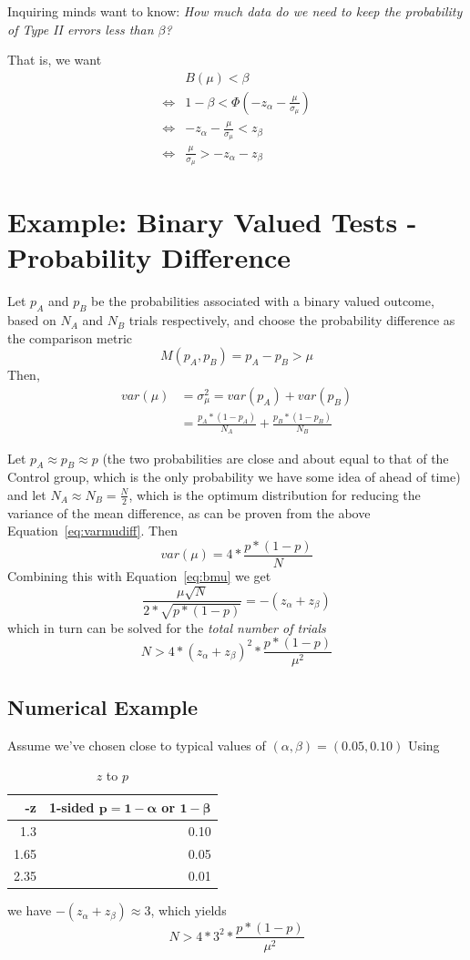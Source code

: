 \documentclass[letterpaper,12pt]{article}
\newcommand{\beq}{\begin{equation}} %
\newcommand{\eeq}{\end{equation}} %
\newcommand{\bb}[1]{\mathbf{#1}}
\begin{document}
Inquiring minds want to know: {\em How much data do we need to keep the probability of Type II errors less than \(\beta\)?}

That is, we want
\beq\label{eq:bmu}
\begin{split}
 & B(\mu)<\beta \\
  \iff& 1-\beta < \Phi(-z_\alpha -\frac{\mu}{\sigma_\mu})\\
  \iff& -z_\alpha -\frac{\mu}{\sigma_\mu} < z_\beta\\
  \iff& \frac{\mu}{\sigma_\mu} > -z_\alpha -z_\beta
\end{split}
\eeq

\section{Example: Binary Valued Tests - Probability Difference}
Let \(p_A\) and \(p_B\) be the probabilities associated with a binary valued outcome, based on \(N_A\) and \(N_B\) trials respectively, and choose the probability difference as the comparison metric
\beq
M(p_A, p_B) = p_A-p_B >\mu
\eeq
Then,
\beq\label{eq:varmudiff}
\begin{split}
  var(\mu)&=\sigma^2_\mu = var(p_A) + var(p_B)\\
  &=\frac{p_A*(1-p_A)}{N_A} + \frac{p_B*(1-p_B)}{N_B}
  \end{split}
\eeq

Let \(p_A\approx p_B\approx p\) (the two probabilities are close and about equal to that of the Control group, which is the only probability we have some idea of ahead of time) and let \(N_A\approx N_B = \frac{N}{2}\), which is the optimum distribution for reducing the variance of the mean difference, as can be proven from the above Equation~\ref{eq:varmudiff}. Then
\beq
var(\mu) = 4*\frac{p*(1-p)}{N}
\eeq
Combining this with Equation~\ref{eq:bmu} we get
\beq
\frac{\mu\sqrt{N}}{2*\sqrt{p*(1-p)}} = -(z_\alpha+z_\beta)
  \eeq
  which in turn can be solved for the {\em total number of trials}
  \beq
  N> 4*(z_\alpha+z_\beta)^2*\frac{p*(1-p)}{\mu^2}
  \eeq

  \subsection{Numerical Example}
  Assume we've chosen close to typical values of \((\alpha,\beta) =(0.05, 0.10)\)
Using
\begin{table}
\centering
\begin{tabular}{|r|r|} \hline \hline
  {\bf -z} & {\bf 1-sided} \(\bb{p=1-\alpha}\) or \(\bb{1-\beta}\)\\
  \hline \hline
  1.3&0.10\\ \hline
  1.65&0.05\\ \hline
  2.35&0.01\\ 
  \hline\hline
\end{tabular}
\caption{\(z\) to \(p\)}
\label{table:ztop}
\end{table}
we have \(-(z_\alpha+z_\beta)\approx 3\), which yields
\beq
N>4*3^2*\frac{p*(1-p)}{\mu^2}
\eeq
\end{document}
